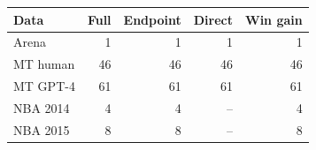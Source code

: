 \begin{tabular}{lrrrr}
\toprule
Data & Full & Endpoint & Direct & Win gain \\
\midrule
Arena & 1 & 1 & 1 & 1 \\
MT human & 46 & 46 & 46 & 46 \\
MT GPT-4 & 61 & 61 & 61 & 61 \\
NBA 2014 & 4 & 4 & -- & 4 \\
NBA 2015 & 8 & 8 & -- & 8 \\
\bottomrule
\end{tabular}
